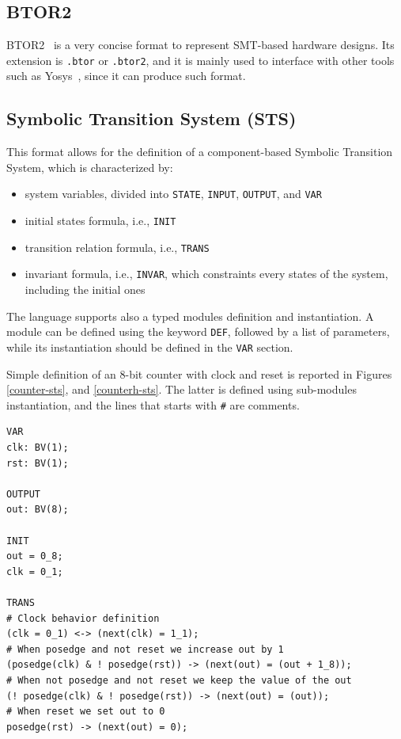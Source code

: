 \documentclass{article}
\theoremstyle{definition}
\begin{document}
\subsection{BTOR2}
BTOR2~\cite{btormc} is a very concise format to represent SMT-based
hardware designs. Its extension is \texttt{.btor} or \texttt{.btor2},
and it is mainly used to interface with other tools such as
Yosys~\cite{wolf2013yosys}, since it can produce such format.

\subsection{Symbolic Transition System (STS)}

This format allows for the definition of a component-based Symbolic
Transition System, which is characterized by:

\begin{itemize}
\item system variables, divided into \texttt{STATE}, \texttt{INPUT},
  \texttt{OUTPUT}, and \texttt{VAR}
\item initial states formula, i.e., \texttt{INIT}
\item transition relation formula, i.e., \texttt{TRANS}
\item invariant formula, i.e., \texttt{INVAR}, which constraints every
  states of the system, including the initial ones
\end{itemize}

The language supports also a typed modules definition and
instantiation. A module can be defined using the keyword \texttt{DEF}, followed
by a list of parameters, while its instantiation should be defined in
the \texttt{VAR} section.

Simple definition of an 8-bit counter with clock and reset is reported
in Figures \ref{counter-sts}, and \ref{counterh-sts}. The latter is
defined using sub-modules instantiation, and the lines that starts
with \texttt{\#} are comments.

\begin{lstlisting}[frame=single,language=sts,caption=Counter example,label=counter-sts]
VAR
clk: BV(1);
rst: BV(1);

OUTPUT
out: BV(8);

INIT
out = 0_8;
clk = 0_1;

TRANS
# Clock behavior definition
(clk = 0_1) <-> (next(clk) = 1_1);
# When posedge and not reset we increase out by 1
(posedge(clk) & ! posedge(rst)) -> (next(out) = (out + 1_8));
# When not posedge and not reset we keep the value of the out
(! posedge(clk) & ! posedge(rst)) -> (next(out) = (out));
# When reset we set out to 0
posedge(rst) -> (next(out) = 0);
\end{lstlisting}
\end{document}
